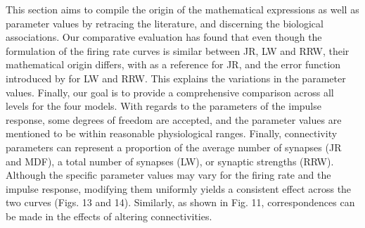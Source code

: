 \documentclass[12pt,twoside]{article}
\begin{document}
This section aims to compile the origin of the mathematical expressions as well as parameter values by retracing the literature, and discerning the biological associations. Our comparative evaluation has found that even though the formulation of the firing rate curves is similar between JR, LW and RRW, their mathematical origin differs, with \citet{da1976models} as a reference for JR, and the error function introduced by \citet{wright1995simulation} for LW and RRW. This explains the variations in the parameter values. Finally, our goal is to provide a comprehensive comparison across all levels for the four models. With regards to the parameters of the impulse response, some degrees of freedom are accepted, and the parameter values are mentioned to be within reasonable physiological ranges. Finally, connectivity parameters can represent a proportion of the average number of synapses (JR and MDF), a total number of synapses (LW), or synaptic strengths (RRW). Although the specific parameter values may vary for the firing rate and the impulse response, modifying them uniformly yields a consistent effect across the two curves (Figs. 13 and 14). Similarly, as shown in Fig. 11, correspondences can be made in the effects of altering connectivities.









\end{document}
